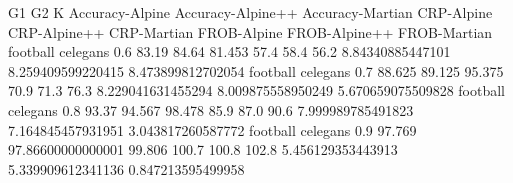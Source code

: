 G1 G2 K Accuracy-Alpine Accuracy-Alpine++ Accuracy-Martian CRP-Alpine CRP-Alpine++ CRP-Martian FROB-Alpine FROB-Alpine++ FROB-Martian
football celegans 0.6 83.19 84.64 81.453 57.4 58.4 56.2 8.84340885447101 8.259409599220415 8.473899812702054
football celegans 0.7 88.625 89.125 95.375 70.9 71.3 76.3 8.229041631455294 8.009875558950249 5.670659075509828
football celegans 0.8 93.37 94.567 98.478 85.9 87.0 90.6 7.999989785491823 7.164845457931951 3.043817260587772
football celegans 0.9 97.769 97.86600000000001 99.806 100.7 100.8 102.8 5.456129353443913 5.339909612341136 0.847213595499958
